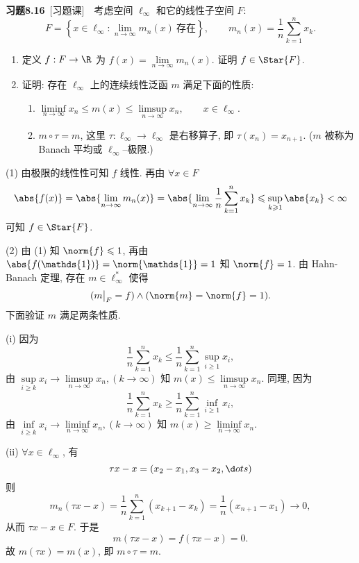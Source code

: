 	\textbf{习题8.16}\ [习题课]\ \ 考虑空间 $ \ell_{\infty} $ 和它的线性子空间 $ F $:
	\[
		F = \left\{ x\in\ell_{\infty}:\lim_{n\to\infty} m_{n}(x)\ \text{存在} \right\}, \qquad m_{n}(x)=\frac{1}{n}\sum_{k=1}^{n} x_{k}.
	\]
	\begin{enumerate}
		\item 定义 $ f:F\to\R $ 为 $ f(x)=\lim\limits_{n\to\infty}m_{n}(x) $. 证明 $ f\in\Star{F} $.
		\item 证明: 存在 $ \ell_{\infty} $ 上的连续线性泛函 $ m $ 满足下面的性质:
		\begin{enumerate}
			\item $ \liminf\limits_{n\to\infty}x_{n}\leqslant m(x)\leqslant\limsup\limits_{n\to\infty}x_{n}, \qquad x\in\ell_{\infty} $.
			\item $ m\circ \tau=m $, 这里 $ \tau: \ell_{\infty}\to\ell_{\infty} $ 是右移算子, 即 $ \tau(x_{n})=x_{n+1} $. ($ m $ 被称为 Banach 平均或 $ \ell_{\infty} $--极限.)
		\end{enumerate}
	\end{enumerate}
	\begin{answer}
		(1) 由极限的线性性可知 $ f $ 线性. 再由 $ \forall x\in F $
		\[
			\abs{f(x)}=\abs{\lim_{n\to\infty}m_{n}(x)}=\abs{\lim_{n\to\infty}\frac{1}{n}\sum_{k=1}^{n}x_{k}}\leqslant \sup_{k\geqslant1}\abs{x_{k}}<\infty
		\]
		可知 $ f\in\Star{F} $.

		(2)  由 (1) 知 $ \norm{f}\leqslant1 $, 再由 $ \abs{f(\mathds{1})}=\norm{\mathds{1}}=1 $ 知 $ \norm{f}=1 $. 由 Hahn-Banach 定理, 存在 $ m\in\ell_{\infty}^{*} $ 使得
		\[
			(m\big|_{F}=f)\land(\norm{m}=\norm{f}=1).
		\]
		下面验证 $ m $ 满足两条性质.

		(i) 因为
		\[
			\frac{1}{n}\sum_{k=1}^{n}x_{k}\leqslant\frac{1}{n}\sum_{k=1}^{n}\sup_{i\geqslant1}x_{i},
		\]
		由 $ \sup\limits_{i\geqslant k}x_{i}\to\limsup\limits_{n\to\infty}x_{n}, (k\to\infty) $ 知 $ m(x)\leqslant\limsup\limits_{n\to\infty}x_{n} $. 同理, 因为
		\[
			\frac{1}{n}\sum_{k=1}^{n}x_{k}\geqslant\frac{1}{n}\sum_{k=1}^{n}\inf_{i\geqslant1}x_{i},
		\]
		由 $ \inf\limits_{i\geqslant k}x_{i}\to\liminf\limits_{n\to\infty}x_{n}, (k\to\infty) $ 知 $ m(x)\geqslant\liminf\limits_{n\to\infty}x_{n} $.

		(ii) $ \forall x\in\ell_{\infty} $, 有
		\[
			\tau x-x=(x_{2}-x_{1}, x_{3}-x_{2}, \d ots)
		\]
		则
		\[ 
			m_{n}(\tau x-x)=\frac{1}{n}\sum_{k=1}^{n}(x_{k+1}-x_{k})=\frac{1}{n}(x_{n+1}-x_{1})\to 0 ,
		\]
		从而 $ \tau x-x\in F $. 于是
		\[
			m(\tau x-x)=f(\tau x-x)=0.
		\]
		故 $ m(\tau x)=m(x) $, 即 $ m\circ \tau =m $.\qedhere
	\end{answer}	

